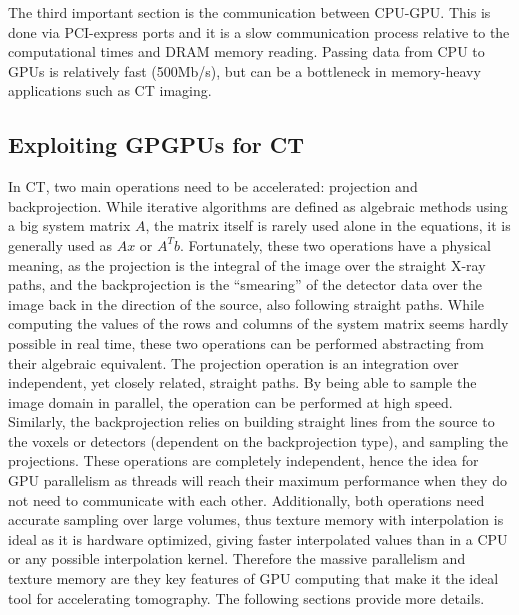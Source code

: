 The third important section is the communication between CPU-GPU. This is done via PCI-express ports and it is a slow communication process relative to the computational times and DRAM memory reading. Passing data from CPU to GPUs is relatively fast (500Mb/s), but can be a bottleneck in memory-heavy applications such as CT imaging.



\subsection{Exploiting GPGPUs for CT}

In CT, two main operations need to be accelerated: projection and backprojection. While iterative algorithms are defined as algebraic methods using a big system matrix $A$, the matrix itself is rarely used alone in the equations, it is generally used as $Ax$ or $A^Tb$. Fortunately, these two operations have a physical meaning, as the projection is the integral of the image over the straight X-ray paths, and the backprojection is the ``smearing'' of the detector data over the image back in the direction of the source, also following straight paths. While computing the values of the rows and columns of the system matrix seems hardly possible in real time, these two operations can be performed abstracting from their algebraic equivalent. The projection operation is an integration over independent, yet closely related, straight paths. By being able to sample the image domain in parallel, the operation can be performed at high speed. Similarly, the backprojection relies on building straight lines from the source to the voxels or detectors (dependent on the backprojection type), and sampling the projections. These operations are completely independent, hence the idea for GPU parallelism as threads will reach their maximum performance when they do not need to communicate with each other. Additionally, both operations need accurate sampling over large volumes, thus texture memory with interpolation is ideal as it is hardware optimized, giving faster interpolated values than in a CPU or any possible interpolation kernel. Therefore the massive parallelism and texture memory are they key features of GPU computing that make it the ideal tool for accelerating tomography. The following sections provide more details.

